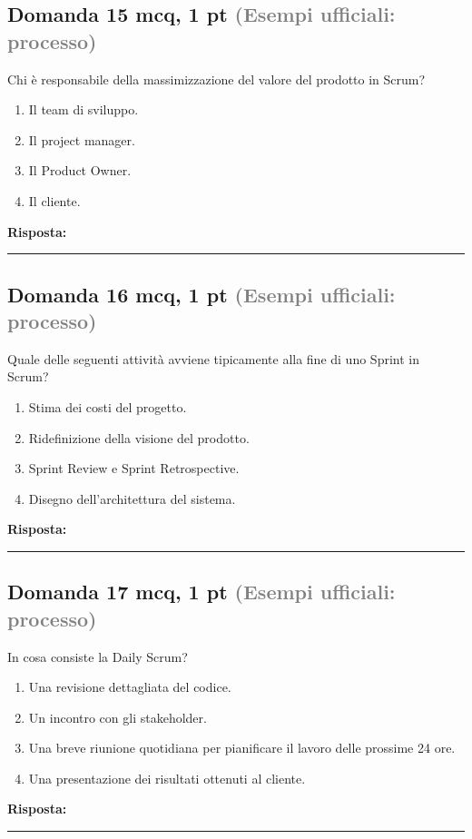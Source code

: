 \documentclass[a4paper,11pt]{article}
\begin{document}
\subsection*{Domanda 15 \hfill {\small mcq, 1 pt \textcolor{gray}{(Esempi ufficiali: processo)}}}
Chi è responsabile della massimizzazione del valore del prodotto in Scrum?

\begin{enumerate}[label=\alph*)]
\item Il team di sviluppo.
\item Il project manager.
\item Il Product Owner.
\item Il cliente.
\end{enumerate}
\vspace{0.2cm}
\noindent\textbf{Risposta:}\par
\vspace{1.5cm}\hrule


\subsection*{Domanda 16 \hfill {\small mcq, 1 pt \textcolor{gray}{(Esempi ufficiali: processo)}}}
Quale delle seguenti attività avviene tipicamente alla fine di uno Sprint in Scrum?

\begin{enumerate}[label=\alph*)]
\item Stima dei costi del progetto.
\item Ridefinizione della visione del prodotto.
\item Sprint Review e Sprint Retrospective.
\item Disegno dell'architettura del sistema.
\end{enumerate}
\vspace{0.2cm}
\noindent\textbf{Risposta:}\par
\vspace{1.5cm}\hrule


\subsection*{Domanda 17 \hfill {\small mcq, 1 pt \textcolor{gray}{(Esempi ufficiali: processo)}}}
In cosa consiste la Daily Scrum?

\begin{enumerate}[label=\alph*)]
\item Una revisione dettagliata del codice.
\item Un incontro con gli stakeholder.
\item Una breve riunione quotidiana per pianificare il lavoro delle prossime 24 ore.
\item Una presentazione dei risultati ottenuti al cliente.
\end{enumerate}
\vspace{0.2cm}
\noindent\textbf{Risposta:}\par
\vspace{1.5cm}\hrule
\end{document}
